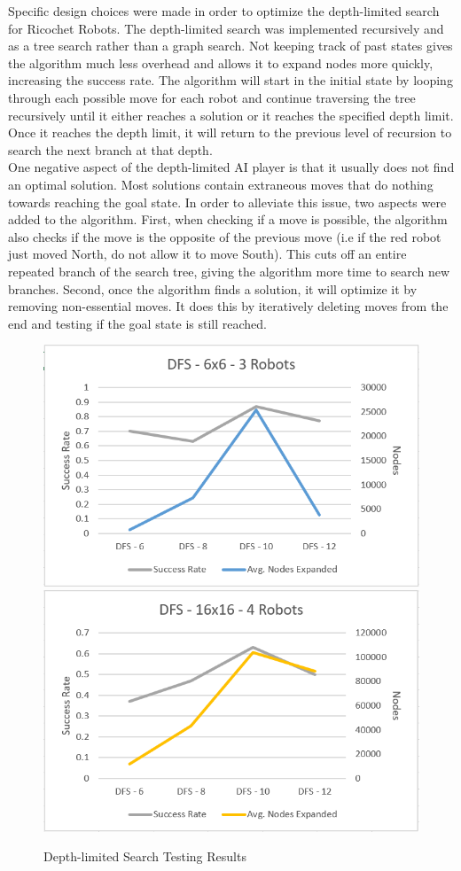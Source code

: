 \documentclass[a4paper,10pt]{article}
\begin{document}
  Specific design choices were made in order to optimize the depth-limited search for Ricochet Robots.  The depth-limited search was implemented recursively and
  as a tree search rather than a graph search.  Not keeping track of past states gives the algorithm much less overhead and allows it to expand nodes more quickly,
  increasing the success rate.  The algorithm will start in the initial state by looping through each possible move for each robot and continue traversing the tree
  recursively until it either reaches a solution or it reaches the specified depth limit.  Once it reaches the depth limit, it will return to the previous level of
  recursion to search the next branch at that depth.  \\

  One negative aspect of the depth-limited AI player is that it usually does not find an optimal solution.  Most solutions contain extraneous moves that do nothing
  towards reaching the goal state.  In order to alleviate this issue, two aspects were added to the algorithm.  First, when checking if a move is possible, the
  algorithm also checks if the move is the opposite of the previous move (i.e if the red robot just moved North, do not allow it to move South).  This cuts off an
  entire repeated branch of the search tree, giving the algorithm more time to search new branches.  Second, once the algorithm finds a solution, it will optimize it
  by removing non-essential moves.  It does this by iteratively deleting moves from the end and testing if the goal state is still reached. \\

  \begin{figure}[h!]
    \centering
   \includegraphics[width=0.45\linewidth]{jacob_tests/img1.PNG}
    \includegraphics[width=0.45\linewidth]{jacob_tests/img2.PNG}
    \caption{Depth-limited Search Testing Results}
    \label{fig:DFS_chart}
  \end{figure}
\end{document}
